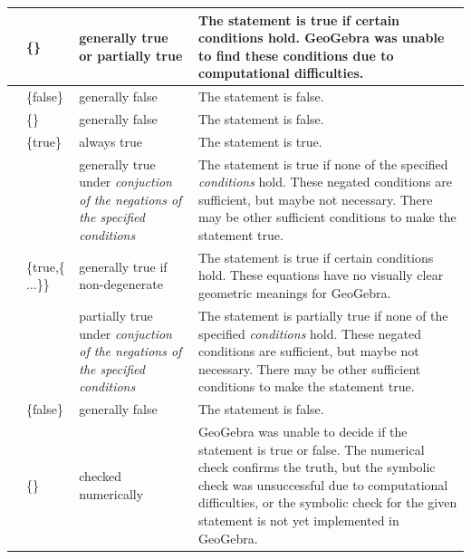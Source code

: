 \documentclass{article}
\begin{document}
\begin{tabular}{|>{\raggedright}m{}|>{\centering}m{}|>{\centering}m{}|>{\centering}m{}|}
\cline{2-4} 
 & {\footnotesize{}\{\}} & {\footnotesize{}generally true\\or partially true} & {\footnotesize{}The statement is true if certain conditions hold.
GeoGebra was unable to find these conditions due to computational
difficulties.}\tabularnewline
\hline 
\multirow{2}{0.15\textwidth}{\centerline{\footnotesize{}false}} & {\footnotesize{}\{false\}} & {\footnotesize{}generally false} & {\footnotesize{}The statement is false.}\tabularnewline
\cline{2-4} 
 & {\footnotesize{}\{\}} & {\footnotesize{}generally false} & {\footnotesize{}The statement is false.}\tabularnewline
\hline 
\multirow{5}{0.15\textwidth}{\centerline{\footnotesize{}undefined}} & {\footnotesize{}\{true\}} & {\footnotesize{}always true} & {\footnotesize{}The statement is true.}\tabularnewline
\cline{2-4} 
 & \multicolumn{1}{>{\centering}m{0.2\columnwidth}|}{{\footnotesize{}\{true,\{}\emph{\footnotesize{}conditions}{\footnotesize{}\}\}}} & {\footnotesize{}generally true under }\emph{\footnotesize{}conjuction of the negations of the specified
conditions} & {\footnotesize{}The statement is true if none of the specified }\emph{\footnotesize{}conditions}{\footnotesize{}
hold. These negated conditions are sufficient, but maybe not necessary. There
may be other sufficient conditions to make the statement true.}\tabularnewline
\cline{2-4} 
 & {\footnotesize{}\{true,\{$\ldots$\}\}} & {\footnotesize{}generally true if non-degenerate} & {\footnotesize{}The statement is true if certain conditions hold.
These equations have no visually clear geometric meanings for GeoGebra.}\tabularnewline
\cline{2-4} 
 & \multicolumn{1}{>{\centering}m{0.2\columnwidth}|}{{\footnotesize{}\{true,\{}\emph{\footnotesize{}conditions}{\footnotesize{}\},``c''\}}} & {\footnotesize{}partially true under }\emph{\footnotesize{}conjuction of the negations of the specified
conditions} & {\footnotesize{}The statement is partially true if none of the specified }\emph{\footnotesize{}conditions}{\footnotesize{}
hold. These negated conditions are sufficient, but maybe not necessary. There
may be other sufficient conditions to make the statement true.}\tabularnewline
\cline{2-4} 
 & {\footnotesize{}\{false\}} & {\footnotesize{}generally false} & {\footnotesize{}The statement is false.}\tabularnewline
\cline{2-4} 
 & {\footnotesize{}\{\}} & {\footnotesize{}checked numerically} & {\footnotesize{}GeoGebra was unable to decide if the statement is
true or false. The numerical check confirms the truth, but the symbolic
check was unsuccessful due to computational difficulties, or the symbolic
check for the given statement is not yet implemented in GeoGebra.}\tabularnewline
\hline 
\end{tabular}
\end{document}
